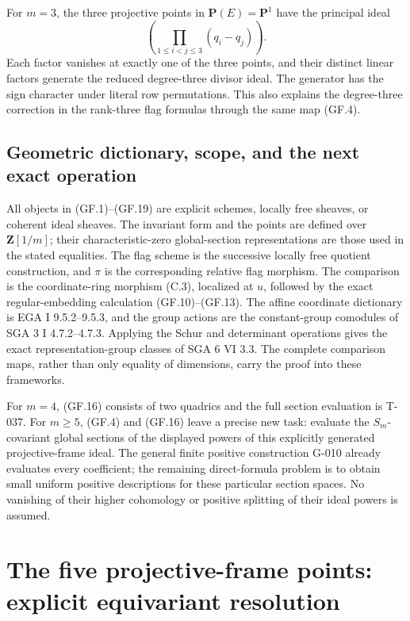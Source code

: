 \documentclass[
  10pt,
]{article}
\begin{document}
For \(m=3\), the three projective points in \(\mathbf P(E)=\mathbf P^1\)
have the principal ideal \[
\left(\prod_{1\le i<j\le3}(q_i-q_j)\right).
\tag{GF.19}
\] Each factor vanishes at exactly one of the three points, and their
distinct linear factors generate the reduced degree-three divisor ideal.
The generator has the sign character under literal row permutations.
This also explains the degree-three correction in the rank-three flag
formulas through the same map (GF.4).

\subsection{Geometric dictionary, scope, and the next exact
operation}\label{geometric-dictionary-scope-and-the-next-exact-operation}

All objects in (GF.1)--(GF.19) are explicit schemes, locally free
sheaves, or coherent ideal sheaves. The invariant form and the points
are defined over \(\mathbf Z[1/m]\); their characteristic-zero
global-section representations are those used in the stated equalities.
The flag scheme is the successive locally free quotient construction,
and \(\pi\) is the corresponding relative flag morphism. The comparison
is the coordinate-ring morphism (C.3), localized at \(u\), followed by
the exact regular-embedding calculation (GF.10)--(GF.13). The affine
coordinate dictionary is EGA I 9.5.2--9.5.3, and the group actions are
the constant-group comodules of SGA 3 I 4.7.2--4.7.3. Applying the Schur
and determinant operations gives the exact representation-group classes
of SGA 6 VI 3.3. The complete comparison maps, rather than only equality
of dimensions, carry the proof into these frameworks.

For \(m=4\), (GF.16) consists of two quadrics and the full section
evaluation is T-037. For \(m\ge5\), (GF.4) and (GF.16) leave a precise
new task: evaluate the \(S_m\)-covariant global sections of the
displayed powers of this explicitly generated projective-frame ideal.
The general finite positive construction G-010 already evaluates every
coefficient; the remaining direct-formula problem is to obtain small
uniform positive descriptions for these particular section spaces. No
vanishing of their higher cohomology or positive splitting of their
ideal powers is assumed.

\section{The five projective-frame points: explicit equivariant
resolution}\label{the-five-projective-frame-points-explicit-equivariant-resolution}
\end{document}
